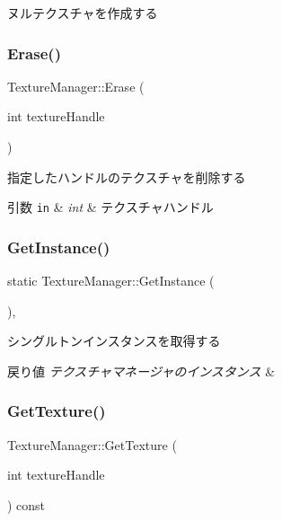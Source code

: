 ヌルテクスチャを作成する 

\mbox{\label{class_texture_manager_abda8c00abcd513182e6447943d1b6808}} 
\subsubsection{\texorpdfstring{Erase()}{Erase()}}
{\footnotesize\ttfamily Texture\+Manager\+::\+Erase (\begin{DoxyParamCaption}\item[{int}]{texture\+Handle }\end{DoxyParamCaption})}

指定したハンドルのテクスチャを削除する 
\begin{DoxyParams}[1]{引数}
\mbox{\tt in}  & {\em int} & テクスチャハンドル \\
\hline
\end{DoxyParams}
\mbox{\label{class_texture_manager_adf67537a12b9a757c363cacbd3d20b56}} 
\subsubsection{\texorpdfstring{Get\+Instance()}{GetInstance()}}
{\footnotesize\ttfamily static Texture\+Manager\+::\+Get\+Instance (\begin{DoxyParamCaption}{ }\end{DoxyParamCaption})\hspace{0.3cm}{\ttfamily [inline]}, {\ttfamily [static]}}

シングルトンインスタンスを取得する 
\begin{DoxyRetVals}{戻り値}
{\em テクスチャマネージャのインスタンス} & \\
\hline
\end{DoxyRetVals}
\mbox{\label{class_texture_manager_a8995fa4f73ade280992c56f47b8d6d9d}} 
\subsubsection{\texorpdfstring{Get\+Texture()}{GetTexture()}}
{\footnotesize\ttfamily Texture\+Manager\+::\+Get\+Texture (\begin{DoxyParamCaption}\item[{int}]{texture\+Handle }\end{DoxyParamCaption}) const}

